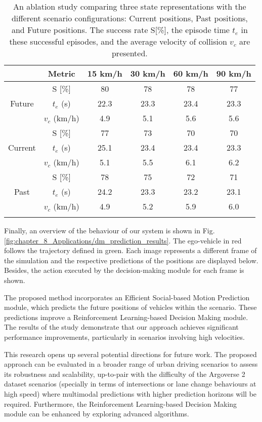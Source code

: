 \begin{table}[h]
	\centering
	\caption{An ablation study comparing three state representations with the different scenario configurations: Current positions, Past positions, and Future positions. The success rate S[\%], the episode time $t_{e}$ in these successful episodes, and the average velocity of collision $v_{c}$ are presented.}
	\label{table:8_dm_ablation_study_smarts}
	\setlength{\extrarowheight}{2pt}
	\begin{tabular}{cccccc} 
		\ChangeRT{1pt}
		& Metric & 15 km/h & 30 km/h & 60 km/h & 90 km/h  \\
		\hline 
		\multirow{3}{*}{Future}
		&S [\%] & 80 & 78 & 78 & 77 \\ 
		&$t_{e}$ (s) & 22.3 & 23.3 & 23.4 & 23.3 \\
		&$v_{c}$ (km/h) & 4.9 & 5.1 & 5.6 & 5.6 \\
		\hline
		\multirow{3}{*}{Current}
		&S [\%] & 77 & 73 & 70 & 70 \\ 
		&$t_{e}$ (s) & 25.1 & 23.4 & 23.4 & 23.3 \\
		&$v_{c}$ (km/h) & 5.1 & 5.5 & 6.1 & 6.2 \\
		\hline
		\multirow{3}{*}{Past}
		&S [\%] & 78 & 75 & 72 & 71 \\ 
		&$t_{e}$ (s) & 24.2 & 23.3 & 23.2 & 23.1 \\
		&$v_{c}$ (km/h) & 4.9 & 5.2 & 5.9 & 6.0 \\
		\hline
		\ChangeRT{1pt}
	\end{tabular}
\end{table}

Finally, an overview of the behaviour of our system is shown in Fig. \ref{fig:chapter_8_Applications/dm_prediction_results}. The ego-vehicle in red follows the trajectory defined in green. Each image represents a different frame of the simulation and the respective predictions of the positions are displayed below. Besides, the action executed by the decision-making module for each frame is shown.

The proposed method incorporates an Efficient Social-based Motion Prediction module, which predicts the future positions of vehicles within the scenario. These predictions improve a Reinforcement Learning-based Decision Making module. The results of the study demonstrate that our approach achieves significant performance improvements, particularly in scenarios involving high velocities.

This research opens up several potential directions for future work. The proposed approach can be evaluated in a broader range of urban driving scenarios to assess its robustness and scalability, up-to-pair with the difficulty of the Argoverse 2 dataset scenarios (specially in terms of intersections or lane change behaviours at high speed) where multimodal predictions with higher prediction horizons will be required. Furthermore, the Reinforcement Learning-based Decision Making module can be enhanced by exploring advanced algorithms.

